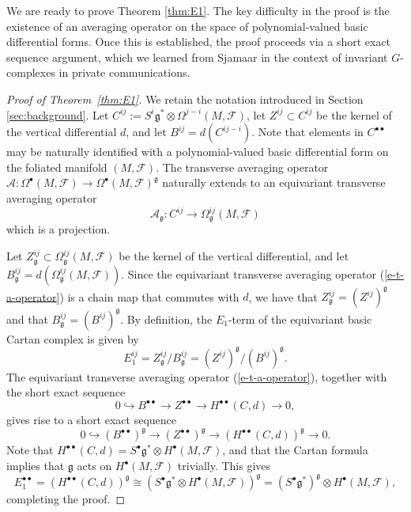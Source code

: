 \documentclass[reqno, 11pt]{amsart}
\theoremstyle{definition}
\theoremstyle{property}
\theoremstyle{remark}
\numberwithin{equation}{section}
\begin{document}
We are ready to prove Theorem \ref{thm:E1}. The key difficulty in the proof is the existence of an averaging operator on the space of polynomial-valued basic differential forms. Once this is established, the proof proceeds via a short exact sequence argument, which we learned from Sjamaar in the context of invariant $G$-complexes in private communications.

\begin{proof}[Proof of Theorem~\ref{thm:E1}]

We retain the notation introduced in Section \ref{sec:background}. Let $C^{ij}:= S^i\mathfrak{g}^* \otimes \Omega^{j-i}(M, \mathcal{F})$, let $Z^{ij}\subset C^{ij}$ be the kernel of the vertical differential $d$, and let $B^{ij}= d(C^{ij-i})$.  Note that elements in $C^{\bullet\bullet}$ may be naturally identified with a polynomial-valued basic differential form on the foliated manifold $(M,\mathcal{F})$. The transverse averaging operator $\mathcal{A}: \Omega^\bullet(M, \mathcal{F})\rightarrow \Omega^\bullet(M, \mathcal{F})^{\mathfrak{g}}$ naturally extends to an equivariant transverse averaging operator 
\begin{equation}\label{e-t-a-operator} \mathcal{A}_{\mathfrak{g}}: C^{ij} \rightarrow \Omega_{\mathfrak{g}}^{ij}(M, \mathcal{F})\end{equation}  which is a projection. 

Let $Z^{ij}_{\mathfrak{g}}\subset  \Omega^{ij}_{\mathfrak{g}}(M, \mathcal{F})$ be the kernel of the vertical differential, and let 
 $B^{ij}_{\mathfrak{g}}= d(\Omega^{ij}_{\mathfrak{g}}(M, \mathcal{F}))$. Since the equivariant transverse averaging operator (\ref{e-t-a-operator}) is a chain map that commutes with $d$, we have that $Z^{ij}_{\mathfrak{g}}=(Z^{ij})^{\mathfrak{g}}$ and that $B^{ij}_{\mathfrak{g}}= (B^{ij})^{\mathfrak{g}}$. By definition, the $E_1$-term of the equivariant basic Cartan complex is given by 
 \[ E_1^{ij}=Z^{ij}_{\mathfrak{g}}/B^{ij}_{\mathfrak{g}}= (Z^{ij})^{\mathfrak{g}}/(B^{ij})^{\mathfrak{g}}.\]
 The equivariant transverse averaging operator (\ref{e-t-a-operator}), together with the short exact sequence
\[ 0\hookrightarrow B^{\bullet\bullet} \rightarrow Z^{\bullet\bullet}\rightarrow H^{\bullet\bullet}(C, d)\rightarrow 0,\]
gives rise to a short exact sequence
\[ 0\hookrightarrow (B^{\bullet\bullet})^{\mathfrak{g}}\rightarrow (Z^{\bullet\bullet})^{\mathfrak{g}}\rightarrow \left( H^{\bullet\bullet}(C, d)\right)^{\mathfrak{g}}\rightarrow 0.\]
Note that $H^{\bullet\bullet}(C, d)=S^\bullet\mathfrak{g}^*\otimes H^\bullet(M,\mathcal{F})$, and that the Cartan formula implies that
$\mathfrak{g}$ acts on $H^\bullet(M,\mathcal{F})$ trivially. This gives
\[ E_1^{\bullet\bullet} = \left(H^{\bullet\bullet}(C, d)\right)^{\mathfrak{g}}
\cong \left(S^\bullet\mathfrak{g}^* \otimes H^{\bullet}(M,
\mathcal{F})\right)^{\mathfrak{g}}= \left(S^\bullet\mathfrak{g}^*\right)^{\mathfrak{g}}\otimes H^\bullet(M, \mathcal{F}),\]
completing the proof.


\end{proof}
\end{document}
